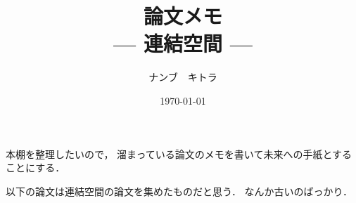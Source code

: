 \documentclass[leqno, a4paper, 12pt]{jsarticle}
\title{論文メモ
\large{\\--- 連結空間 ---}
}
\author{ナンブ　キトラ}
\date{\today}
\begin{document}
\maketitle

本棚を整理したいので，
溜まっている論文のメモを書いて未来への手紙とすることにする．


以下の論文は連結空間の論文を集めたものだと思う．
なんか古いのばっかり．







\nocite{*}


\end{document}
